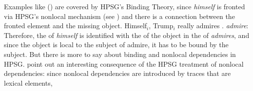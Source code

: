 \documentclass[output=paper,biblatex,babelshorthands,newtxmath,draftmode,colorlinks,citecolor=brown]{langscibook}
\begin{document}
Examples like () are covered by HPSG's Binding Theory, since \emph{himself} is fronted via
HPSG's nonlocal mechanism (see ) and there is a connection between the
fronted element and the missing object.
\eal
\ex Himself$_i$, Trump$_i$ really admires \trace.
\ex \emph{admire}:\\
    \argst {}
\zl
Therefore, the \localv of \emph{himself} is identified with the \localv of the object in the \argstl of
\emph{admires}, and since the object is local to the subject of admire, it has to be bound by the
subject. But there is more to say about binding and nonlocal dependencies in HPSG.
\citet[]{ps2} point out an interesting consequence of the HPSG treatment of nonlocal
dependencies: since nonlocal dependencies are introduced by traces that are lexical elements,
\end{document}
